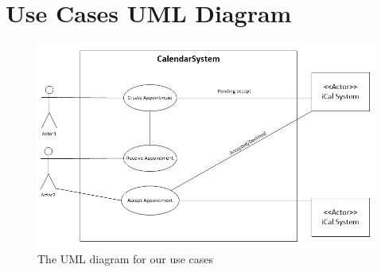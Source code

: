 \section{Use Cases UML Diagram}
\begin{figure}[h!]
  \includegraphics[width=\textwidth,natwidth=839,natheight=508]{illustrations/UseCaseUML.png}
  \caption{The UML diagram for our use cases}
\end{figure}
\newpage
